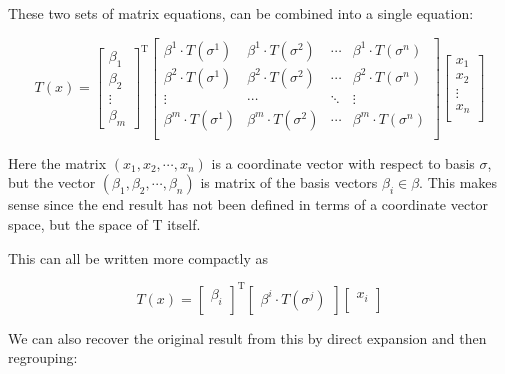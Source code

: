 These two sets of matrix equations, can be combined into a single equation:

\begin{equation}\label{eqn:matOfLinTx:matrixexpansion}
T(x) = 
{
\begin{bmatrix}
\beta_1 \\
\beta_2 \\
\vdots \\
\beta_m
\end{bmatrix}
}^{\text{T}}
\begin{bmatrix}
\beta^1 \cdot T(\sigma^1) & \beta^1 \cdot T(\sigma^2) & \cdots & \beta^1 \cdot T(\sigma^n) \\
\beta^2 \cdot T(\sigma^1) & \beta^2 \cdot T(\sigma^2) & \cdots & \beta^2 \cdot T(\sigma^n) \\
\vdots & \cdots & \ddots & \vdots \\
\beta^m \cdot T(\sigma^1) & \beta^m \cdot T(\sigma^2) & \cdots & \beta^m \cdot T(\sigma^n) \\
\end{bmatrix}
\begin{bmatrix}
x_1 \\
x_2 \\
\vdots \\
x_n \\
\end{bmatrix}
\end{equation}

Here the matrix $( x_1, x_2, \cdots, x_n )$ is a coordinate vector with respect to basis $\sigma$, but the vector 
$( \beta_1, \beta_2, \cdots, \beta_n )$ is matrix of the basis vectors $\beta_i \in \beta$.  This makes sense since the end result has not been defined in terms of
a coordinate vector space, but the space of T itself.

This can all be written more compactly as 

\begin{equation}
T(x)
= 
{
\begin{bmatrix}
\beta_i \\
\end{bmatrix}
}^{\text{T}}
\begin{bmatrix}
\beta^i \cdot T(\sigma^j)
\end{bmatrix}
\begin{bmatrix}
x_i \\
\end{bmatrix}
\end{equation}

We can also recover the original result from this by direct expansion and then regrouping:

